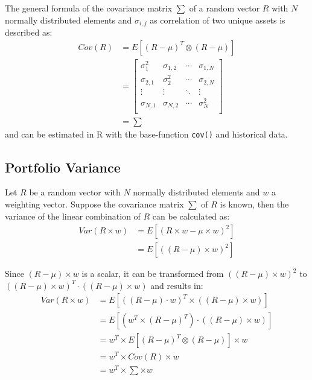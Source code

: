 \documentclass[
  oneside]{book}
\begin{document}
The general formula of the covariance matrix \(\textstyle\sum\) of a random vector \(R\) with \(N\) normally distributed elements and \(\sigma_{i,j}\) as correlation of two unique assets is described as:
\begin{align*}
  Cov(R) &= E[(R-\mu)^T \otimes (R-\mu)] \\
  &=   \begin{bmatrix}
    \sigma_1^2 & \sigma_{1,2} & \cdots & \sigma_{1,N} \\
    \sigma_{2, 1} & \sigma_2^2 & \cdots & \sigma_{2, N} \\
    \vdots  & \vdots & \ddots & \vdots \\
    \sigma_{N, 1} & \sigma_{N, 2} & \cdots & \sigma_N^2 \\
 \end{bmatrix}\\
  &=\textstyle\sum
\end{align*}
and can be estimated in R with the base-function \texttt{cov()} and historical data.

\hypertarget{portvar}{%
\subsection{Portfolio Variance}\label{portvar}}

Let \(R\) be a random vector with \(N\) normally distributed elements and \(w\) a weighting vector. Suppose the covariance matrix \(\sum\) of \(R\) is known, then the variance of the linear combination of \(R\) can be calculated as:
\begin{align*}
  Var(R \times w) &= E[(R \times w - \mu \times w)^2] \\
  &= E[((R - \mu) \times w)^2]
\end{align*}

Since \((R - \mu) \times w\) is a scalar, it can be transformed from \(((R - \mu) \times w)^2\) to \(((R - \mu) \times w)^T \cdot ((R - \mu) \times w)\) and results in:
\begin{align*}
  Var(R \times w) &= E[((R - \mu) \cdot w)^T \times ((R - \mu) \times w)]\\ 
  &= E[(w^T \times (R - \mu)^T) \cdot ((R - \mu) \times w)]\\ 
  &= w^T \times E[(R - \mu)^T \otimes (R - \mu)] \times w \\
  &= w^T \times Cov(R) \times w \\
  &= w^T \times \textstyle\sum \times w
\end{align*}
\end{document}
